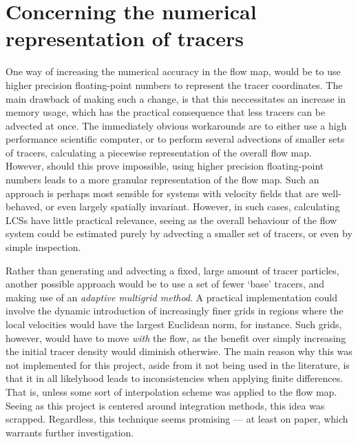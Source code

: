 \section{Concerning the numerical representation of tracers}
\label{sec:concerning_the_numerical_representation_of_tracers}

One way of increasing the numerical accuracy in the flow map, would be
to use higher precision floating-point numbers to represent the tracer
coordinates. The main drawback of making such a change, is that this
neccessitates an increase in memory usage, which has the practical consequence
that less tracers can be advected at once. The immediately obvious workarounds
are to either use a high performance scientific computer, or to perform several
advections of smaller sets of tracers, calculating a piecewise representation
of the overall flow map. However, should this prove impossible, using higher
precision floating-point numbers leads to a more granular representation of the
flow map. Such an approach is perhaps most sensible for systems with velocity
fields that are well-behaved, or even largely spatially invariant. However,
in such cases, calculating LCSs have little practical relevance, seeing as
the overall behaviour of the flow system could be estimated purely by
advecting a smaller set of tracers, or even by simple inspection.

Rather than generating and advecting a fixed, large amount of tracer particles,
another possible approach would be to use a set of fewer `base' tracers, and
making use of an \emph{adaptive multigrid method}. A practical implementation
could involve the dynamic introduction of increasingly finer grids in regions
where the local velocities would have the largest Euclidean norm, for instance.
Such grids, however, would have to move \emph{with} the flow, as the
benefit over simply increasing the initial tracer density would diminish
otherwise. The main reason why this was not implemented for this project,
aside from it not being used in the literature, is that it in all likelyhood
leads to inconsistencies when applying finite differences. That is, unless some
sort of interpolation scheme was applied to the flow map. Seeing as this
project is centered around integration methods, this idea was scrapped.
Regardless, this technique seems promising --- at least on paper, which
warrants further investigation.

\vspace{\fill}
